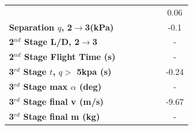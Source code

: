 \begin{table}[ht]
\begin{tabular}{l c c c c c c}
	& \secondthirdSeparationgammamSPARTANNinetyFiveNoReturn
	& \secondthirdSeparationgammamSPARTANNinetySevenFiveNoReturn
	& \secondthirdSeparationgammamSPARTANStandardNoReturn
	& \secondthirdSeparationgammamSPARTANOneHundredTwoFiveNoReturn
	& \secondthirdSeparationgammamSPARTANOneHundredFiveNoReturn
	&0.06
	\\
	\textbf{Separation $q$, 2$\rightarrow$3(kPa)}
	& \secondthirdSeparationqmSPARTANNinetyFiveNoReturn
	& \secondthirdSeparationqmSPARTANNinetySevenFiveNoReturn
	& \secondthirdSeparationqmSPARTANStandardNoReturn
	& \secondthirdSeparationqmSPARTANOneHundredTwoFiveNoReturn
	& \secondthirdSeparationqmSPARTANOneHundredFiveNoReturn
	&-0.1
	\\
	\textbf{2$^{nd}$ Stage L/D, 2$\rightarrow$3}
	& \secondthirdSeparationNetIspmSPARTANNinetyFiveNoReturn
	& \secondthirdSeparationNetIspmSPARTANNinetySevenFiveNoReturn
	& \secondthirdSeparationNetIspmSPARTANStandardNoReturn
	& \secondthirdSeparationNetIspmSPARTANOneHundredTwoFiveNoReturn
	& \secondthirdSeparationNetIspmSPARTANOneHundredFiveNoReturn
	& -
	\\
	\textbf{2$^{nd}$ Stage Flight Time (s)}
	& \secondFlightTimemSPARTANNinetyFiveNoReturn
	& \secondFlightTimemSPARTANNinetySevenFiveNoReturn
	& \secondFlightTimemSPARTANStandardNoReturn
	& \secondFlightTimemSPARTANOneHundredTwoFiveNoReturn
	& \secondFlightTimemSPARTANOneHundredFiveNoReturn
	& -
	\\
	\textbf{3$^{rd}$ Stage $t$, $q >$ 5kpa (s)}
	& \thirdqOverFivemSPARTANNinetyFiveNoReturn
	& \thirdqOverFivemSPARTANNinetySevenFiveNoReturn
	& \thirdqOverFivemSPARTANStandardNoReturn
	& \thirdqOverFivemSPARTANOneHundredTwoFiveNoReturn
	& \thirdqOverFivemSPARTANOneHundredFiveNoReturn
	&-0.24
	\\
	\textbf{3$^{rd}$ Stage max $\alpha$ (deg)}
	& \thirdmaxAoAmSPARTANNinetyFiveNoReturn
	& \thirdmaxAoAmSPARTANNinetySevenFiveNoReturn
	& \thirdmaxAoAmSPARTANStandardNoReturn
	& \thirdmaxAoAmSPARTANOneHundredTwoFiveNoReturn
	& \thirdmaxAoAmSPARTANOneHundredFiveNoReturn
	& -
	\\
	\textbf{3$^{rd}$ Stage final v (m/s)}
	& \thirdcircvmSPARTANNinetyFiveNoReturn
	& \thirdcircvmSPARTANNinetySevenFiveNoReturn
	& \thirdcircvmSPARTANStandardNoReturn
	& \thirdcircvmSPARTANOneHundredTwoFiveNoReturn
	& \thirdcircvmSPARTANOneHundredFiveNoReturn
	&-9.67
	\\
	\textbf{3$^{rd}$ Stage final m (kg)}
	& \thirdcircmmSPARTANNinetyFiveNoReturn
	& \thirdcircmmSPARTANNinetySevenFiveNoReturn
	& \thirdcircmmSPARTANStandardNoReturn
	& \thirdcircmmSPARTANOneHundredTwoFiveNoReturn
	& \thirdcircmmSPARTANOneHundredFiveNoReturn
	& -
	\\
	\hline 
\end{tabular} 

\end{table}

